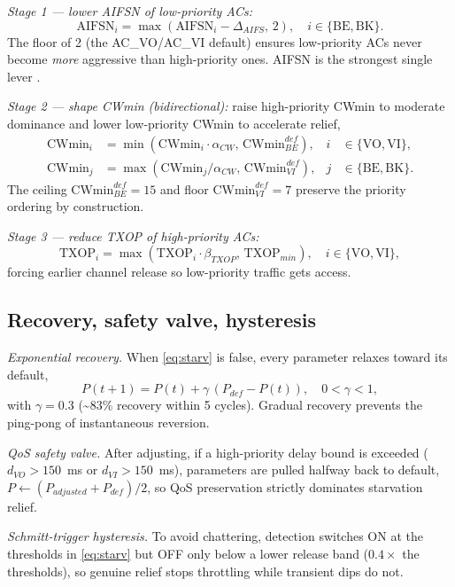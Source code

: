 \documentclass[conference]{IEEEtran}
\newcommand{\AC}[1]{AC\_#1}
\begin{document}
\emph{Stage 1 --- lower AIFSN of low-priority ACs:}
\begin{equation}
\text{AIFSN}_i=\max(\text{AIFSN}_i-\Delta_{AIFS},\,2),\quad i\in\{\text{BE},\text{BK}\}.
\end{equation}
The floor of 2 (the \AC{VO}/\AC{VI} default) ensures low-priority ACs never
become \emph{more} aggressive than high-priority ones. AIFSN is the strongest
single lever \cite{ugwu}.

\emph{Stage 2 --- shape CWmin (bidirectional):} raise high-priority CWmin to
moderate dominance and lower low-priority CWmin to accelerate relief,
\begin{align}
\text{CWmin}_i &=\min(\text{CWmin}_i\cdot\alpha_{CW},\,\text{CWmin}_{BE}^{def}),
& i&\in\{\text{VO},\text{VI}\},\\
\text{CWmin}_j &=\max(\text{CWmin}_j/\alpha_{CW},\,\text{CWmin}_{VI}^{def}),
& j&\in\{\text{BE},\text{BK}\}.
\end{align}
The ceiling $\text{CWmin}_{BE}^{def}{=}15$ and floor
$\text{CWmin}_{VI}^{def}{=}7$ preserve the priority ordering by construction.

\emph{Stage 3 --- reduce TXOP of high-priority ACs:}
\begin{equation}
\text{TXOP}_i=\max(\text{TXOP}_i\cdot\beta_{TXOP},\,\text{TXOP}_{min}),\quad i\in\{\text{VO},\text{VI}\},
\end{equation}
forcing earlier channel release so low-priority traffic gets access.

\subsection{Recovery, safety valve, hysteresis}
\emph{Exponential recovery.} When \eqref{eq:starv} is false, every parameter
relaxes toward its default,
\begin{equation}
P(t{+}1)=P(t)+\gamma\,(P_{def}-P(t)),\quad 0<\gamma<1,
\end{equation}
with $\gamma=0.3$ (\textasciitilde83\% recovery within 5 cycles). Gradual
recovery prevents the ping-pong of instantaneous reversion.

\emph{QoS safety valve.} After adjusting, if a high-priority delay bound is
exceeded ($d_{VO}>150$~ms or $d_{VI}>150$~ms), parameters are pulled halfway
back to default,
$P\leftarrow(P_{adjusted}+P_{def})/2$, so QoS preservation strictly dominates
starvation relief.

\emph{Schmitt-trigger hysteresis.} To avoid chattering, detection switches ON
at the thresholds in \eqref{eq:starv} but OFF only below a lower release band
($0.4\times$ the thresholds), so genuine relief stops throttling while
transient dips do not.
\end{document}
